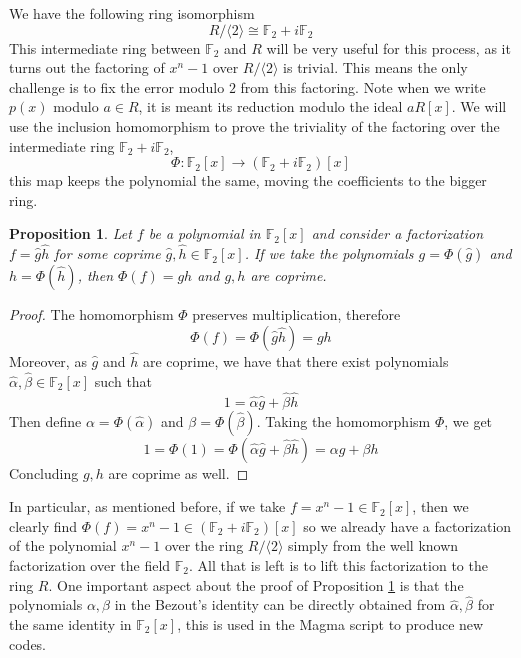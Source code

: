 \documentclass[a4paper, 12pt]{amsart}
\newtheorem{proposition}[lemma]{Proposition}
\theoremstyle{definition}
\newcommand{\F}{{\mathbb F}}
\numberwithin{equation}{section}
\numberwithin{table}{section}
\begin{document}
    We have the following ring isomorphism
    \[R/\langle 2 \rangle \cong \F_2 + i \F_2\]
This intermediate ring between $\F_2$ and $R$ will be very useful for this process, as it turns out the factoring of $x^n-1$ over $R/\langle 2 \rangle$ is trivial. This means the only challenge is to fix the error modulo $2$ from this factoring. Note when we write $p(x)$ modulo $a \in R$, it is meant its reduction modulo the ideal $aR[x]$.
We will use the inclusion homomorphism to prove the triviality of the factoring over the intermediate ring $\F_2 + i\F_2$,
\[\Phi: \F_2[x] \to (\F_2 + i \F_2)[x]\]
this map keeps the polynomial the same, moving the coefficients to the bigger ring.

\begin{proposition}\label{skiplift}
    Let $f$ be a polynomial in $\F_2[x]$ and consider a factorization $f =\hat g\hat h$ for some coprime $\hat g, \hat h \in \F_2[x]$. If we take the polynomials $g = \Phi(\hat g)$ and $h = \Phi(\hat h)$, then $\Phi (f) = gh$ and $g,h$ are coprime.
\end{proposition}

\begin{proof}
    The homomorphism $\Phi$ preserves multiplication, therefore
    \[\Phi(f) = \Phi\left( \hat g\hat h\right) =  g h\]
    Moreover, as $\hat g$ and $\hat h$ are coprime, we have that there exist polynomials $\hat \alpha, \hat\beta \in \F_2[x]$ such that
    \[1 = \hat \alpha \hat g + \hat\beta\hat h\]
    Then define $\alpha = \Phi(\hat \alpha)$ and $\beta =\Phi(\hat \beta)$. Taking the homomorphism $\Phi$, we get
    \[1 = \Phi(1) = \Phi(\hat \alpha \hat g + \hat\beta\hat h) = \alpha g + \beta h\]
    Concluding $g,h$ are coprime as well.
\end{proof}

In particular, as mentioned before, if we take $f = x^n-1 \in \F_2[x]$, then we clearly find $\Phi(f) = x^n-1\in (\F_2+i\F_2)[x]$ so we already have a factorization of the polynomial $x^n-1$ over the ring $R/\langle 2 \rangle$ simply from the well known factorization over the field $\F_2$. All that is left is to lift this factorization to the ring $R$.
One important aspect about the proof of Proposition \ref{skiplift} is that the polynomials $\alpha,\beta$ in the Bezout's identity can be directly obtained from $\hat \alpha, \hat \beta$ for the same identity in $\F_2[x]$, this is used in the Magma script to produce new codes.
\end{document}
